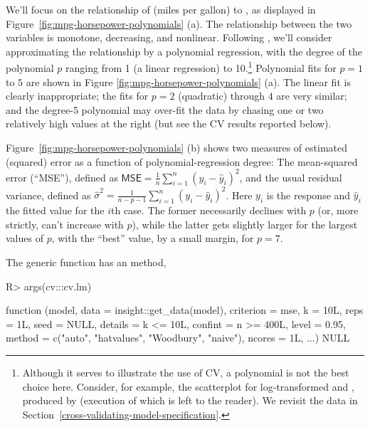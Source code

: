 \documentclass[
]{jss}
\begin{document}
We'll focus on the relationship of  (miles per gallon) to
, as displayed in
Figure~\ref{fig:mpg-horsepower-polynomials} (a). The relationship
between the two variables is monotone, decreasing, and nonlinear.
Following \citet{JamesEtAl:2021}, we'll consider approximating the
relationship by a polynomial regression, with the degree of the
polynomial \(p\) ranging from 1 (a linear regression) to 10.\footnote{Although
  it serves to illustrate the use of CV, a polynomial is not the best
  choice here. Consider, for example, the scatterplot for
  log-transformed  and , produced by
   (execution
  of which is left to the reader). We revisit the  data in
  Section~\ref{cross-validating-model-specification}.} Polynomial fits
for \(p = 1\) to \(5\) are shown in Figure
\ref{fig:mpg-horsepower-polynomials} (a). The linear fit is clearly
inappropriate; the fits for \(p = 2\) (quadratic) through \(4\) are very
similar; and the degree-5 polynomial may over-fit the data by chasing
one or two relatively high  values at the right (but see the
CV results reported below).

Figure~\ref{fig:mpg-horsepower-polynomials} (b) shows two measures of
estimated (squared) error as a function of polynomial-regression degree:
The mean-squared error (``MSE''), defined as
\(\mathsf{MSE} = \frac{1}{n}\sum_{i=1}^n (y_i - \widehat{y}_i)^2\), and
the usual residual variance, defined as
\(\widehat{\sigma}^2 = \frac{1}{n - p - 1} \sum_{i=1}^n (y_i - \widehat{y}_i)^2\).
Here \(y_i\) is the response and \(\widehat{y}_i\) the fitted value for
the \(i\)th case. The former necessarily declines with \(p\) (or, more
strictly, can't increase with \(p\)), while the latter gets slightly
larger for the largest values of \(p\), with the ``best'' value, by a
small margin, for \(p = 7\).

The generic  function has an  method,

\begin{CodeChunk}
\begin{CodeInput}
R> args(cv:::cv.lm)
\end{CodeInput}
\begin{CodeOutput}
function (model, data = insight::get_data(model), criterion = mse,
    k = 10L, reps = 1L, seed = NULL, details = k <= 10L, confint = n >=
        400L, level = 0.95, method = c("auto", "hatvalues", "Woodbury",
        "naive"), ncores = 1L, ...)
NULL
\end{CodeOutput}
\end{CodeChunk}
\end{document}
